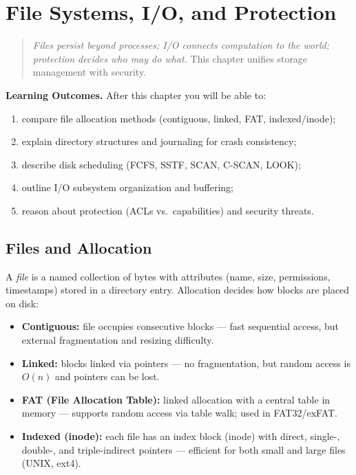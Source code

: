 \chapter{File Systems, I/O, and Protection}
\label{ch:filesec}

\begin{quote}
\emph{Files persist beyond processes; I/O connects computation to the world;
protection decides who may do what.} This chapter unifies storage management
with security.
\end{quote}

\noindent\textbf{Learning Outcomes.} After this chapter you will be able to:
\begin{enumerate}[label=(L\arabic*)]
  \item compare file allocation methods (contiguous, linked, FAT, indexed/inode);
  \item explain directory structures and journaling for crash consistency;
  \item describe disk scheduling (FCFS, SSTF, SCAN, C-SCAN, LOOK);
  \item outline I/O subsystem organization and buffering;
  \item reason about protection (ACLs vs.\ capabilities) and security threats.
\end{enumerate}

\section{Files and Allocation}
\label{sec:files}

A \emph{file} is a named collection of bytes with attributes (name, size,
permissions, timestamps) stored in a directory entry. Allocation decides how
blocks are placed on disk:

\begin{itemize}
  \item \textbf{Contiguous:} file occupies consecutive blocks --- fast sequential
        access, but external fragmentation and resizing difficulty.
  \item \textbf{Linked:} blocks linked via pointers --- no fragmentation, but
        random access is $O(n)$ and pointers can be lost.
  \item \textbf{FAT (File Allocation Table):} linked allocation with a central
        table in memory --- supports random access via table walk; used in FAT32/exFAT.
  \item \textbf{Indexed (inode):} each file has an index block (inode) with
        direct, single-, double-, and triple-indirect pointers --- efficient
        for both small and large files (UNIX, ext4).
\end{itemize}

